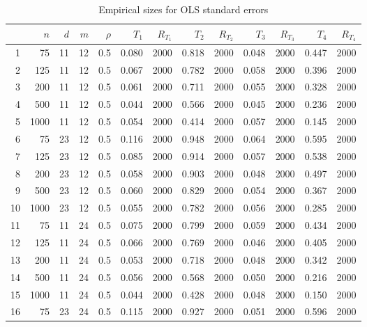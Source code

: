 \documentclass{article}
\begin{document}
\begin{table}[ht]
\begin{center}
\caption{Empirical sizes for OLS standard errors}
\label{tab:size}
\begin{tabular}{rrrrrrrrrrrrr}
  \hline
 & $n$ & $d$ & $m$ & $\rho$ & $T_1$ & $R_{T_1}$ & $T_2$ & $R_{T_2}$ & $T_3$ & $R_{T_3}$ & $T_4$ & $R_{T_4}$ \\ 
  \hline
1 & 75 & 11 & 12 & 0.5 & 0.080 & 2000 & 0.818 & 2000 & 0.048 & 2000 & 0.447 & 2000 \\ 
  2 & 125 & 11 & 12 & 0.5 & 0.067 & 2000 & 0.782 & 2000 & 0.058 & 2000 & 0.396 & 2000 \\ 
  3 & 200 & 11 & 12 & 0.5 & 0.061 & 2000 & 0.711 & 2000 & 0.055 & 2000 & 0.328 & 2000 \\ 
  4 & 500 & 11 & 12 & 0.5 & 0.044 & 2000 & 0.566 & 2000 & 0.045 & 2000 & 0.236 & 2000 \\ 
  5 & 1000 & 11 & 12 & 0.5 & 0.054 & 2000 & 0.414 & 2000 & 0.057 & 2000 & 0.145 & 2000 \\ 
   \hline
6 & 75 & 23 & 12 & 0.5 & 0.116 & 2000 & 0.948 & 2000 & 0.064 & 2000 & 0.595 & 2000 \\ 
  7 & 125 & 23 & 12 & 0.5 & 0.085 & 2000 & 0.914 & 2000 & 0.057 & 2000 & 0.538 & 2000 \\ 
  8 & 200 & 23 & 12 & 0.5 & 0.058 & 2000 & 0.903 & 2000 & 0.048 & 2000 & 0.497 & 2000 \\ 
  9 & 500 & 23 & 12 & 0.5 & 0.060 & 2000 & 0.829 & 2000 & 0.054 & 2000 & 0.367 & 2000 \\ 
  10 & 1000 & 23 & 12 & 0.5 & 0.055 & 2000 & 0.782 & 2000 & 0.056 & 2000 & 0.285 & 2000 \\ 
   \hline
11 & 75 & 11 & 24 & 0.5 & 0.075 & 2000 & 0.799 & 2000 & 0.059 & 2000 & 0.434 & 2000 \\ 
  12 & 125 & 11 & 24 & 0.5 & 0.066 & 2000 & 0.769 & 2000 & 0.046 & 2000 & 0.405 & 2000 \\ 
  13 & 200 & 11 & 24 & 0.5 & 0.053 & 2000 & 0.718 & 2000 & 0.048 & 2000 & 0.342 & 2000 \\ 
  14 & 500 & 11 & 24 & 0.5 & 0.056 & 2000 & 0.568 & 2000 & 0.050 & 2000 & 0.216 & 2000 \\ 
  15 & 1000 & 11 & 24 & 0.5 & 0.044 & 2000 & 0.428 & 2000 & 0.048 & 2000 & 0.150 & 2000 \\ 
   \hline
16 & 75 & 23 & 24 & 0.5 & 0.115 & 2000 & 0.927 & 2000 & 0.051 & 2000 & 0.596 & 2000 \\ 

\end{tabular}
\end{center}
\end{table}
\end{document}
